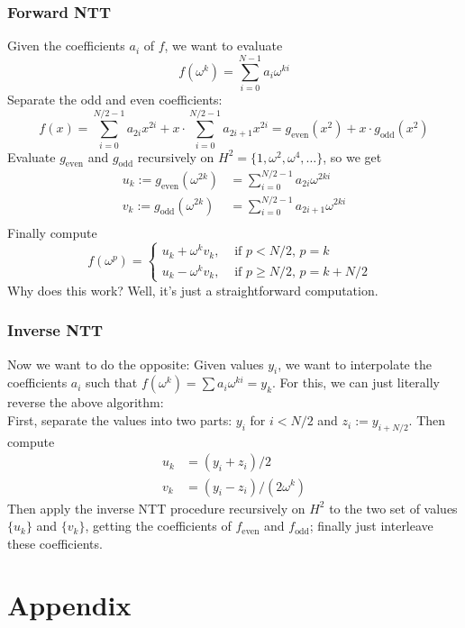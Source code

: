 \documentclass[12pt,draft,a4paper,openany,oneside]{amsbook}
\def\even{\mathrm{even}}
\def\odd{\mathrm{odd}}
\theoremstyle{plain}
\theoremstyle{definition}
\begin{document}
\subsection*{Forward NTT}
Given the coefficients $a_i$ of $f$, we want to evaluate
\[ f(\omega^k) = \sum_{i=0}^{N-1} a_i\omega^{ki} \]
Separate the odd and even coefficients:
\[ f(x) = \sum_{i=0}^{N/2-1} a_{2i}x^{2i} + x\cdot\sum_{i=0}^{N/2-1} a_{2i+1}x^{2i} 
        = g_\even(x^2) + x\cdot g_\odd(x^2)
\]
Evaluate $g_\even$ and $g_\odd$ recursively on $H^2=\{1,\omega^2,\omega^4,\dots\}$,
so we get
\begin{align*}
u_k := g_\even(\omega^{2k}) &= \sum_{i=0}^{N/2-1} a_{2i  }\omega^{2ki} \\
v_k := g_\odd (\omega^{2k}) &= \sum_{i=0}^{N/2-1} a_{2i+1}\omega^{2ki} \\
\end{align*}
Finally compute 
\[
f(\omega^p) = \left\{\begin{array}{ll}
 u_k + \omega^k v_k, & \textrm{ if $p<   N/2$, $p=k$     } \\
 u_k - \omega^k v_k, & \textrm{ if $p\ge N/2$, $p=k+N/2$ } 
\end{array}\right.
\]
Why does this work? Well, it's just a straightforward computation.

\subsection*{Inverse NTT}
Now we want to do the opposite: Given values $y_i$, we want to interpolate
the coefficients $a_i$ such that $f(\omega^k)=\sum a_i\omega^{ki} = y_k$.
For this, we can just literally reverse the above algorithm:\\

First, separate the values into two parts: $y_i$ for $i<N/2$ and $z_i:=y_{i+N/2}$.
Then compute
\begin{align*}
 u_k &= (y_i+z_i)/2            \\
 v_k &= (y_i-z_i)/(2\omega^k)
\end{align*}
Then apply the inverse NTT procedure recursively on $H^2$ to the two set
of values $\{u_k\}$ and $\{v_k\}$, getting the coefficients of $f_\even$
and $f_\odd$; finally just interleave these coefficients.



\chapter{Appendix}
\end{document}
